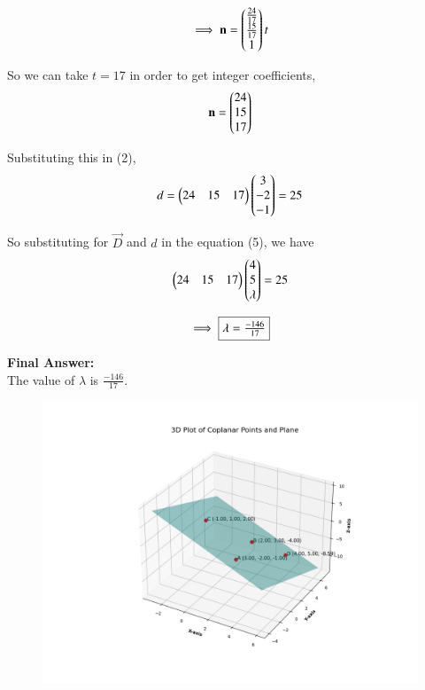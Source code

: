 \documentclass[journal,12pt,onecolumn]{IEEEtran}
\theoremstyle{remark}
\begin{document}
\begin{equation}
    \implies \mathbf{n} = \begin{pmatrix}\frac{24}{17}\\ \frac{15}{17}\\ 1\end{pmatrix} t
\end{equation}

So we can take $t=17$ in order to get integer coefficients,
\begin{equation}
    \mathbf{n} = \begin{pmatrix}24\\15\\17\end{pmatrix}
\end{equation}

Substituting this in (2),
\begin{equation}
    d = \begin{pmatrix}24&15&17\end{pmatrix}\begin{pmatrix}3\\-2\\-1\end{pmatrix} = 25
\end{equation}

So substituting for $\vec{D}$ and $d$ in the equation (5), we have
\begin{equation}
    \begin{pmatrix}24&15&17\end{pmatrix}\begin{pmatrix}4\\5\\\lambda\end{pmatrix} = 25
\end{equation}

\begin{equation}
    \implies \fbox{$\lambda = \frac{-146}{17}$}
\end{equation}

\textbf{Final Answer:}\\
The value of $\lambda$ is $\frac{-146}{17}$.

\begin{figure}[H]
    \centering
    \includegraphics[width=1.05\columnwidth]{figs/2.png}
\end{figure}
\end{document}
